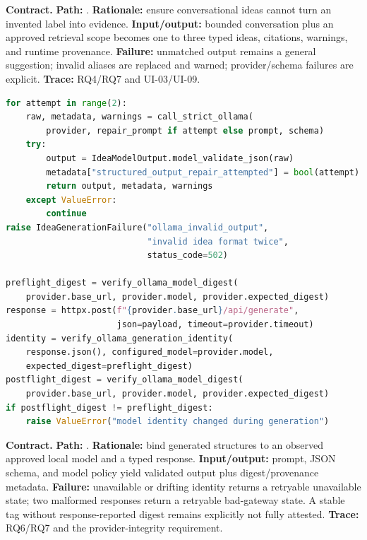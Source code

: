 \noindent\textbf{Contract.} \textbf{Path:} . \textbf{Rationale:} ensure conversational ideas cannot turn an invented label into evidence. \textbf{Input/output:} bounded conversation plus an approved retrieval scope becomes one to three typed ideas, citations, warnings, and runtime provenance. \textbf{Failure:} unmatched output remains a general suggestion; invalid aliases are replaced and warned; provider/schema failures are explicit. \textbf{Trace:} RQ4/RQ7 and UI-03/UI-09.

\begin{lstlisting}[language=Python,basicstyle=\ttfamily\footnotesize,caption={Abridged strict schema and local-model identity checks.}]
for attempt in range(2):
    raw, metadata, warnings = call_strict_ollama(
        provider, repair_prompt if attempt else prompt, schema)
    try:
        output = IdeaModelOutput.model_validate_json(raw)
        metadata["structured_output_repair_attempted"] = bool(attempt)
        return output, metadata, warnings
    except ValueError:
        continue
raise IdeaGenerationFailure("ollama_invalid_output",
                            "invalid idea format twice",
                            status_code=502)

preflight_digest = verify_ollama_model_digest(
    provider.base_url, provider.model, provider.expected_digest)
response = httpx.post(f"{provider.base_url}/api/generate",
                      json=payload, timeout=provider.timeout)
identity = verify_ollama_generation_identity(
    response.json(), configured_model=provider.model,
    expected_digest=preflight_digest)
postflight_digest = verify_ollama_model_digest(
    provider.base_url, provider.model, provider.expected_digest)
if postflight_digest != preflight_digest:
    raise ValueError("model identity changed during generation")
\end{lstlisting}

\noindent\textbf{Contract.} \textbf{Path:} . \textbf{Rationale:} bind generated structures to an observed approved local model and a typed response. \textbf{Input/output:} prompt, JSON schema, and model policy yield validated output plus digest/provenance metadata. \textbf{Failure:} unavailable or drifting identity returns a retryable unavailable state; two malformed responses return a retryable bad-gateway state. A stable tag without response-reported digest remains explicitly not fully attested. \textbf{Trace:} RQ6/RQ7 and the provider-integrity requirement.

